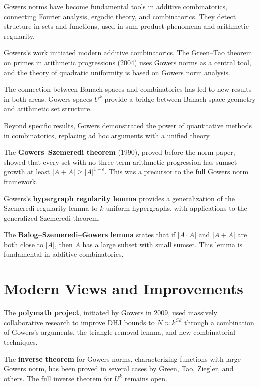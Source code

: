 Gowers norms have become fundamental tools in additive
combinatorics, connecting Fourier analysis, ergodic theory, and
combinatorics.  They detect structure in sets and functions, used in
sum-product phenomena and arithmetic regularity.

Gowers's work initiated modern additive combinatorics.  The
Green--Tao theorem on primes in arithmetic progressions (2004) uses
Gowers norms as a central tool, and the theory of quadratic
uniformity is based on Gowers norm analysis.

The connection between Banach spaces and combinatorics has led to new
results in both areas.  Gowers spaces $U^k$ provide a bridge between
Banach space geometry and arithmetic set structure.

Beyond specific results, Gowers demonstrated the power of
quantitative methods in combinatorics, replacing ad hoc arguments
with a unified theory.

The \textbf{Gowers--Szemeredi theorem} (1990), proved before the
norm paper, showed that every set with no three-term arithmetic
progression has sumset growth at least
$|A+A|\geq |A|^{1+\epsilon}$.  This was a precursor to the full
Gowers norm framework.

Gowers's \textbf{hypergraph regularity lemma} provides a
generalization of the Szemeredi regularity lemma to $k$-uniform
hypergraphs, with applications to the generalized Szemeredi theorem.

The \textbf{Balog--Szemeredi--Gowers lemma} states that if
$|A\cdot A|$ and $|A+A|$ are both close to $|A|$, then $A$ has a
large subset with small sumset.  This lemma is fundamental in
additive combinatorics.

\section{Modern Views and Improvements}

The \textbf{polymath project}, initiated by Gowers in 2009, used
massively collaborative research to improve DHJ bounds to
$N\approx k^{Ck}$ through a combination of Gowers's arguments, the
triangle removal lemma, and new combinatorial techniques.

The \textbf{inverse theorem} for Gowers norms, characterizing
functions with large Gowers norm, has been proved in several cases
by Green, Tao, Ziegler, and others.  The full inverse theorem for
$U^k$ remains open.

